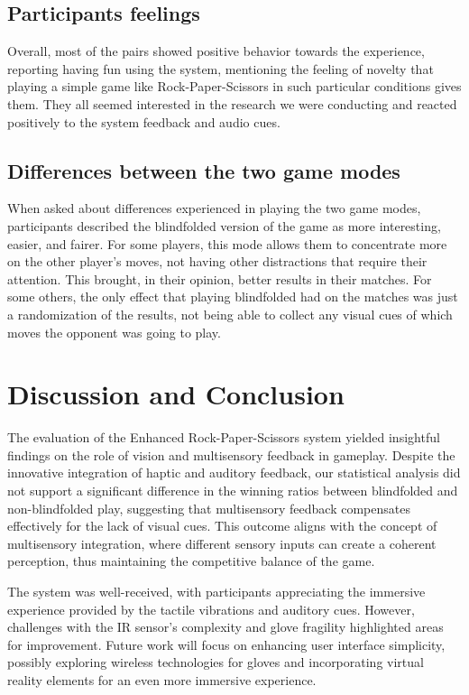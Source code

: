 \documentclass[11pt,a4paper]{report}
\begin{document}
\subsection*{Participants feelings}
Overall, most of the pairs showed positive behavior towards the experience, reporting having fun using the system, mentioning the feeling of novelty that playing a simple game like Rock-Paper-Scissors in such particular conditions gives them. They all seemed interested in the research we were conducting and reacted positively to the system feedback and audio cues.

\subsection*{Differences between the two game modes}
When asked about differences experienced in playing the two game modes, participants described the blindfolded version of the game as more interesting, easier, and fairer. For some players, this mode allows them to concentrate more on the other player's moves, not having other distractions that require their attention. This brought, in their opinion, better results in their matches. For some others, the only effect that playing blindfolded had on the matches was just a randomization of the results, not being able to collect any visual cues of which moves the opponent was going to play.

\section*{Discussion and Conclusion}
The evaluation of the Enhanced Rock-Paper-Scissors system yielded insightful findings on the role of vision and multisensory feedback in gameplay. Despite the innovative integration of haptic and auditory feedback, our statistical analysis did not support a significant difference in the winning ratios between blindfolded and non-blindfolded play, suggesting that multisensory feedback compensates effectively for the lack of visual cues. This outcome aligns with the concept of multisensory integration, where different sensory inputs can create a coherent perception, thus maintaining the competitive balance of the game.

\noindent The system was well-received, with participants appreciating the immersive experience provided by the tactile vibrations and auditory cues. However, challenges with the IR sensor's complexity and glove fragility highlighted areas for improvement. Future work will focus on enhancing user interface simplicity, possibly exploring wireless technologies for gloves and incorporating virtual reality elements for an even more immersive experience.
\end{document}
